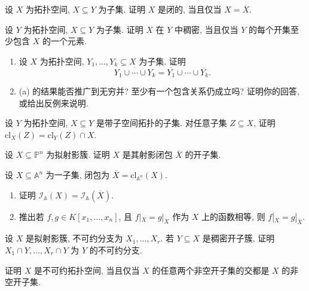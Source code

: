\BookExerciseHeading
\begin{BookExercises}
  \item\label{ex:closed-subset-equals-topological-closure} 设 $X$ 为拓扑空间, $X\subseteq Y$ 为子集. 证明 $X$ 是闭的, 当且仅当 $X=\overline{X}$.
  \item\label{ex:density-characterized-by-open-sets} 设 $Y$ 为拓扑空间, $X\subseteq Y$ 为子集. 证明 $X$ 在 $Y$ 中稠密, 当且仅当 $Y$ 的每个开集至少包含 $X$ 的一个元素.
  \item\label{ex:closure-commutes-with-finite-unions}
  \begin{enumerate}
    \item 设 $X$ 为拓扑空间, $Y_{1},\ldots,Y_{k}\subseteq X$ 为子集. 证明
    \[
      \overline{Y_{1}\cup\cdots\cup Y_{k}}
      =\overline{Y_{1}}\cup\cdots\cup\overline{Y_{k}}.
    \]
    \item (a) 的结果能否推广到无穷并? 至少有一个包含关系仍成立吗? 证明你的回答, 或给出反例来说明.
  \end{enumerate}
  \item\label{ex:closure-in-subspace-is-restricted-ambient-closure} 设 $Y$ 为拓扑空间, $X\subseteq Y$ 是带子空间拓扑的子集. 对任意子集 $Z\subseteq X$, 证明 $\mathrm{cl}_{X}(Z)=\mathrm{cl}_{Y}(Z)\cap X$.
  \item\label{ex:quasiprojective-variety-open-in-its-closure} 设 $X\subseteq\mathbb{P}^{n}$ 为拟射影簇. 证明 $X$ 是其射影闭包 $\overline{X}$ 的开子集.
  \item\label{ex:affine-closure-preserves-vanishing-ideal} 设 $X\subseteq\mathbb{A}^{n}$ 为一子集, 闭包为 $\overline{X}=\mathrm{cl}_{\mathbb{A}^{n}}(X)$.
  \begin{enumerate}
    \item 证明 $\mathcal{I}_{\mathbb{A}}(X)=\mathcal{I}_{\mathbb{A}}(\overline{X})$.
    \item 推出若 $f,g\in K[x_{1},\ldots,x_{n}]$, 且 $f|_{X}=g|_{X}$ 作为 $X$ 上的函数相等, 则 $f|_{\overline{X}}=g|_{\overline{X}}$.
  \end{enumerate}
  \item\label{ex:irreducible-components-of-dense-open-subvariety} 设 $X$ 是拟射影簇, 不可约分支为 $X_{1},\ldots,X_{r}$. 若 $Y\subseteq X$ 是稠密开子簇, 证明 $X_{1}\cap Y,\ldots,X_{r}\cap Y$ 为 $Y$ 的不可约分支.
  \item\label{ex:irreducibility-criterion-by-nonempty-open-sets} 证明 $X$ 是不可约拓扑空间, 当且仅当 $X$ 的任意两个非空开子集的交都是 $X$ 的非空开子集.
\end{BookExercises}

